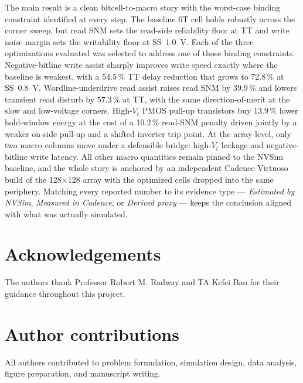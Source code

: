 \documentclass[pdflatex,sn-mathphys-num]{sn-jnl}%
\theoremstyle{thmstyleone}%
\theoremstyle{thmstyletwo}%
\theoremstyle{thmstylethree}%
\begin{document}
The main result is a clean bitcell-to-macro story with the worst-case binding constraint identified at every step. The baseline 6T cell holds robustly across the corner sweep, but read SNM sets the read-side reliability floor at TT and write noise margin sets the writability floor at SS~1.0~V. Each of the three optimizations evaluated was selected to address one of those binding constraints. Negative-bitline write assist sharply improves write speed exactly where the baseline is weakest, with a 54.5\,\% TT delay reduction that grows to 72.8\,\% at SS~0.8~V. Wordline-underdrive read assist raises read SNM by 39.9\,\% and lowers transient read disturb by 57.3\,\% at TT, with the same direction-of-merit at the slow and low-voltage corners. High-$V_t$ PMOS pull-up transistors buy 13.9\,\% lower hold-window energy at the cost of a 10.2\,\% read-SNM penalty driven jointly by a weaker on-side pull-up and a shifted inverter trip point. At the array level, only two macro columns move under a defensible bridge: high-$V_t$ leakage and negative-bitline write latency. All other macro quantities remain pinned to the NVSim baseline, and the whole story is anchored by an independent Cadence Virtuoso build of the 128$\times$128 array with the optimized cells dropped into the same periphery. Matching every reported number to its evidence type — \emph{Estimated by NVSim}, \emph{Measured in Cadence}, or \emph{Derived proxy} — keeps the conclusion aligned with what was actually simulated.

\backmatter

\section*{Acknowledgements}
The authors thank Professor Robert M. Radway and TA Kefei Bao for their guidance throughout this project.

\section*{Author contributions}
All authors contributed to problem formulation, simulation design, data analysis, figure preparation, and manuscript writing.
\end{document}
